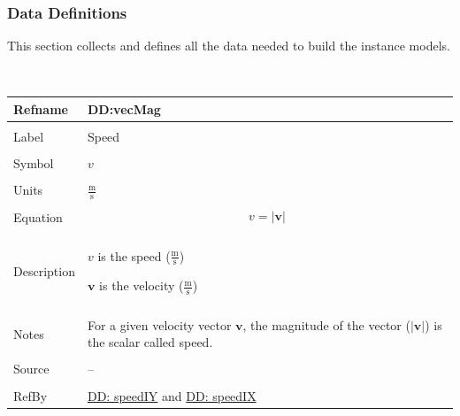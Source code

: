 \documentclass[12pt]{article}
\begin{document}
\subsubsection{Data Definitions}
\label{Sec:DDs}
This section collects and defines all the data needed to build the instance models.
\par~

\noindent \begin{minipage}{\textwidth}
          \begin{tabular}{>{\raggedright}p{}>{\raggedright\arraybackslash}p{}}
          \toprule \textbf{Refname} & \textbf{DD:vecMag}
          \label{DD:vecMag}
          \\ \midrule \\
          Label & Speed
          \\ \midrule \\
          Symbol & $v$
          \\ \midrule \\
          Units & $\frac{\text{m}}{\text{s}}$
          \\ \midrule \\
          Equation & \begin{displaymath}
                     v=|\mathbf{v}|
                     \end{displaymath}
          \\ \midrule \\
          Description & \begin{symbDescription}
                        \item{$v$ is the speed ($\frac{\text{m}}{\text{s}}$)}
                        \item{$\mathbf{v}$ is the velocity ($\frac{\text{m}}{\text{s}}$)}
                        \end{symbDescription}
          \\ \midrule \\
          Notes & For a given velocity vector $\mathbf{v}$, the magnitude of the vector ($|\mathbf{v}|$) is the scalar called speed.
          \\ \midrule \\
          Source & --
          \\ \midrule \\
          RefBy & \hyperref[DD:speedIY]{DD: speedIY} and \hyperref[DD:speedIX]{DD: speedIX}
          \\ \bottomrule
          \end{tabular}
          \end{minipage}
\par~
\end{document}
